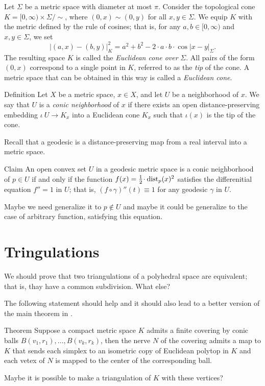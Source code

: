 \documentclass[a4paper,10pt]{article}
\begin{document}
Let $\Sigma$ be a metric space with diameter at most $\pi$.
Consider the topological cone
$K=[0,\infty)\times\Sigma/{\sim}$, where $(0,x)\sim(0,y)$ for all $x,y\in\Sigma$.
We equip $K$ with the metric defined by the rule of cosines;
that is, for any $a,b\in[0,\infty)$ and $x,y\in\Sigma$,
we set
$$|(a,x)-(b,y)|_K^2=a^2+b^2-2\cdot a\cdot b\cdot\cos |x-y|_\Sigma.$$
The resulting space $K$ is called the \emph{Euclidean cone over} $\Sigma$.
All pairs of the form $(0,x)$ correspond to a single point in $K$,
referred to as the \emph{tip} of the cone.
A metric space that can be obtained in this way is called a \emph{Euclidean cone}.


\begin{thm}{Definition}
Let $X$ be a metric space, $x\in X$, and let $U$ be a neighborhood of $x$.
We say that $U$ is a \emph{conic neighborhood} of $x$
if there exists an open distance-preserving embedding
$\iota \: U \to K_x$
into a Euclidean cone $K_x$
such that $\iota(x)$ is the tip of the cone.
\end{thm}

Recall that a geodesic is a distance-preserving map from a real interval into a metric space.

\begin{thm}{Claim}
An open convex set $U$ in a geodesic metric space is a conic neighborhood of $p\in U$ if and only if the function $f(x)=\tfrac12\cdot\dist_p(x)^2$ satisfies the differenitial equation $f''=1$ in $U$;
that is, $(f\circ\gamma)''(t)\equiv 1$ for any geodesic $\gamma$ in $U$.
\end{thm}

Maybe we need generalize it to $p\notin U$ and maybe it could be generalize to the case of arbitrary function, satisfying this equation.

\section{Tringulations}

We should prove that two triangulations of a polyhedral space are equivalent;
that is, thay have a common subdivision.
What else?

The following statement should help and it should also lead to a better version of the main theorem in \cite{lebedeva-petrunin}.

\begin{thm}{Theorem}
Suppose a compact metric space $K$ admits a finite covering by conic balls $B(v_1,r_1),\dots,B(v_k,r_k)$,
then the nerve $N$ of the covering admits a map to $K$ that sends each simplex to an isometric copy of Euclidean polytop in $K$ and each vetex of $N$ is mapped to the center of the corresponding ball.
\end{thm}

Maybe it is possible to make a triangulation of $K$ with these vertices?



{\sloppy
\printbibliography[heading=bibintoc]
\fussy
}
\end{document}
